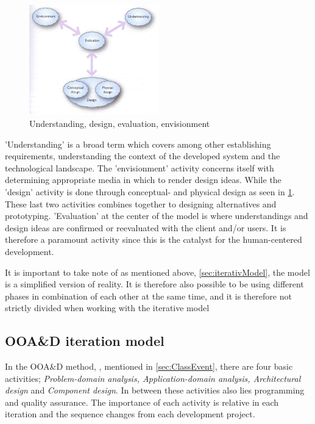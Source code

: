 \begin{figure}[H]
	\centering
	\includegraphics[width=0.5\textwidth]{billeder/DEBModel.jpg}
	\caption{Understanding, design, evaluation, envisionment \citep[p.~49]{Benyon}}\label{fig:DEBModel}
\end{figure}
'Understanding' is a broad term which covers among other establishing requirements, understanding the context of the developed system and the technological landscape.
The 'envisionment' activity concerns itself with determining appropriate media in which to render design ideas.
While the 'design' activity is done through conceptual- and physical design as seen in \cref{fig:DEBModel}.
These last two activities combines together to designing alternatives and prototyping.
'Evaluation' at the center of the model is where understandings and design ideas are confirmed or reevaluated with the client and/or users.
It is therefore a paramount activity since this is the catalyst for the human-centered development.

It is important to take note of as mentioned above, \cref{sec:iterativModel}, the model is a simplified version of reality.
It is therefore also possible to be using different phases in combination of each other at the same time, and it is therefore not strictly divided when working with the iterative model

\subsection{OOA\&D iteration model}\label{sec:Iterative3}

In the OOA\&D method, \cite{Rod-Aalborg}, mentioned in \cref{sec:ClassEvent},  there are four basic activities; \textit{Problem-domain analysis, Application-domain analysis, Architectural design} and \textit{Component design}.
In between these activities  also lies programming and quality assurance.
The importance of each activity is relative in each iteration and the sequence changes from each development project.

